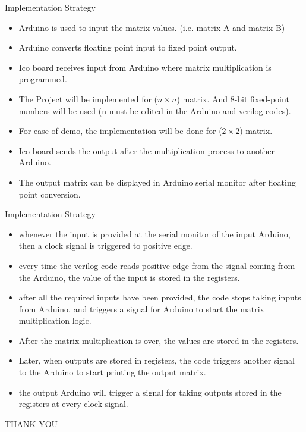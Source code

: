 \documentclass[10pt]{beamer}
\begin{document}
\begin{frame}[fragile]{Implementation Strategy}
	\begin{itemize}
		\item Arduino is used to input the matrix values. (i.e. matrix A and matrix B)
		\item Arduino converts floating point input to fixed point output. 
		\item Ico board receives input from Arduino where matrix multiplication is programmed.
		\item The Project will be implemented for (\(n\times n\)) matrix. And 8-bit fixed-point numbers will be used (n must be edited in the Arduino and verilog codes).
		\item For ease of demo, the implementation will be done for (\(2\times2\)) matrix.
		\item Ico board sends the output after the multiplication process to another Arduino.
		\item The output matrix can be displayed in Arduino serial monitor after floating point conversion.
	\end{itemize}
\end{frame}
\begin{frame}[fragile]{Implementation Strategy}
    \begin{itemize}
        \item whenever the input is provided at the serial monitor of the input Arduino, then a clock signal is triggered to positive edge.
        \item every time the verilog code reads positive edge from the signal coming from the Arduino, the value of the input is stored in the registers.
        \item after all the required inputs have been provided, the code stops taking inputs from Arduino. and triggers a signal for Arduino to start the matrix multiplication logic.
        \item After the matrix multiplication is over, the values are stored in the registers. 
        \item Later, when outputs are stored in registers, the code triggers another signal to the Arduino to start printing the output matrix.
        \item the output Arduino will trigger a signal for taking outputs stored in the registers at every clock signal.
    \end{itemize}
\end{frame}

{
\begin{frame}[standout]
  \Huge{THANK YOU}
\end{frame}
}
\end{document}
